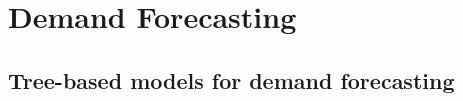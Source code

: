 \chapter{Demand Forecasting}
\label{ch:demand_forecasting}


\section{Tree-based models for demand forecasting}
\label{sec:tree_based_models}

